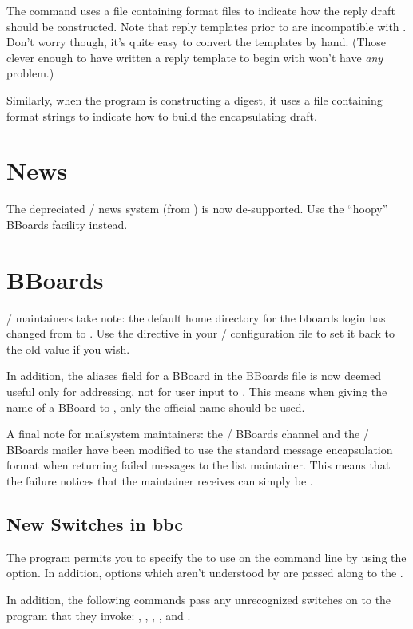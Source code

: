 The  command uses a file containing format files to
indicate how the reply draft should be constructed.
Note that reply templates prior to  are incompatible with .
Don't worry though,
it's quite easy to convert the templates by hand.
(Those clever enough to have written a reply template to begin with won't
have {\em any\/} problem.)

Similarly, when the  program is constructing a digest,
it uses a file containing format strings to indicate how to build the
encapsulating draft.

\section*	{News}
The depreciated \MH/ news system (from ) is now de-supported.
Use the ``hoopy'' BBoards facility instead.

\section*	{BBoards}
\MH/ maintainers take note:
the default home directory for the bboards login has changed from
 to .
Use the  directive in your \MH/ configuration file to set
it back to the old value if you wish.

In addition, the aliases field for a BBoard in the BBoards file is now
deemed useful only for addressing, not for user input to .
This means when giving the name of a BBoard to ,
only the official name should be used.

A final note for mailsystem maintainers:
the \MMDFII/ BBoards channel and the \SendMail/ BBoards mailer have been
modified to use the standard message encapsulation format when returning
failed messages to the list maintainer.
This means that the failure notices that the maintainer receives can
simply be .

\subsection*	{New Switches in bbc}
The  program permits you to specify the  to use on the
command line by using the  option.
In addition, options which aren't understood by  are passed along to
the .

In addition, the following commands
pass any unrecognized switches on to the program that they invoke:
, , , , and .

